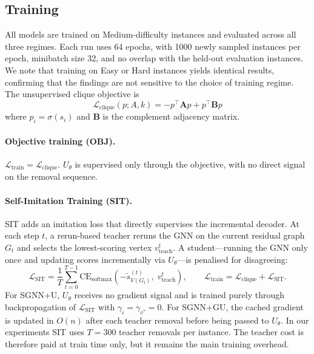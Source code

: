 \documentclass[11pt]{article}
\theoremstyle{plain}
\theoremstyle{remark}
\theoremstyle{plain}
\begin{document}
\subsection{Training}
\label{sec:training}

All models are trained on Medium-difficulty instances and evaluated across all three
regimes. Each run uses 64 epochs, with 1000 newly sampled instances per epoch,
minibatch size 32, and no overlap with the held-out evaluation instances. We note
that training on Easy or Hard instances yields identical results, confirming that
the findings are not sensitive to the choice of training regime. The unsupervised
clique objective is
\[
  \mathcal{L}_{\mathrm{clique}}(p; A, k)
  =
  -p^\top \mathbf{A} p
  +
  p^\top \mathbf{B} p
\]
where $p_i = \sigma(s_i)$ and $\mathbf{B}$ is the complement adjacency matrix.

\paragraph{Objective training (OBJ).}
$\mathcal{L}_{\mathrm{train}} = \mathcal{L}_{\mathrm{clique}}$. $U_\theta$ is
supervised only through the objective, with no direct signal on the removal sequence.

\paragraph{Self-Imitation Training (SIT).}
SIT adds an imitation loss that directly supervises the incremental decoder. At each
step $t$, a rerun-based teacher reruns the GNN on the current residual graph $G_t$
and selects the lowest-scoring vertex $v^t_{\mathrm{teach}}$. A student---running
the GNN only once and updating scores incrementally via $U_\theta$---is penalised
for disagreeing:
\[
  \mathcal{L}_{\mathrm{SIT}} = \frac{1}{T} \sum_{t=0}^{T-1}
  \mathrm{CE}_{\mathrm{softmax}}\!\left(-\tilde{s}^{(t)}_{V(G_t)},\;
  v^t_{\mathrm{teach}}\right),
  \qquad
  \mathcal{L}_{\mathrm{train}} = \mathcal{L}_{\mathrm{clique}} +
  \mathcal{L}_{\mathrm{SIT}}.
\]
For SGNN+U, $U_\theta$ receives no gradient signal and is trained purely through
backpropagation of $\mathcal{L}_{\mathrm{SIT}}$ with $\gamma_i = \gamma_{v^*} = 0$.
For SGNN+GU, the cached gradient is updated in $O(n)$ after each teacher removal
before being passed to $U_\theta$. In our experiments SIT uses $T=300$ teacher
removals per instance. The teacher cost is therefore paid at train time only, but
it remains the main training overhead.
\end{document}
